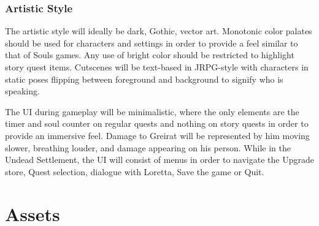 \documentclass[11pt,fleqn]{book} %
\begin{document}
\section{Artistic Style}

The artistic style will ideally be dark, Gothic, vector art. Monotonic color palates should be used for characters and settings in order to provide a feel similar to that of Souls games. Any use of bright color should be restricted to highlight story quest items. Cutscenes will be text-based in JRPG-style with characters in static poses flipping between foreground and background to signify who is speaking.

\quad The UI during gameplay will be minimalistic, where the only elements are the timer and soul counter on regular quests and nothing on story quests in order to provide an immersive feel.  Damage to Greirat will be represented by him moving slower, breathing louder, and damage appearing on his person. While in the Undead Settlement, the UI will consist of menus in order to navigate the Upgrade store, Quest selection, dialogue with Loretta, Save the game or Quit.









\part{Assets}


\end{document}
